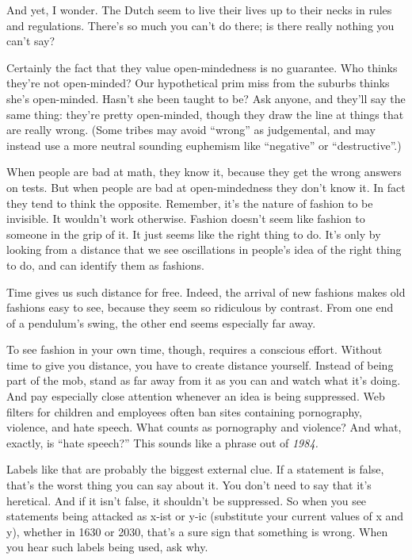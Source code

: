 And yet, I wonder. The Dutch seem to live their lives up to their necks
in rules and regulations. There's so much you can't do there; is there
really nothing you can't say?

Certainly the fact that they value open-mindedness is no guarantee. Who
thinks they're not open-minded? Our hypothetical prim miss from the
suburbs thinks she's open-minded. Hasn't she been taught to be? Ask
anyone, and they'll say the same thing: they're pretty open-minded,
though they draw the line at things that are really wrong. (Some tribes
may avoid ``wrong'' as judgemental, and may instead use a more neutral
sounding euphemism like ``negative'' or ``destructive''.)

When people are bad at math, they know it, because they get the wrong
answers on tests. But when people are bad at open-mindedness they don't
know it. In fact they tend to think the opposite. Remember, it's the
nature of fashion to be invisible. It wouldn't work otherwise. Fashion
doesn't seem like fashion to someone in the grip of it. It just seems
like the right thing to do. It's only by looking from a distance that we
see oscillations in people's idea of the right thing to do, and can
identify them as fashions.

Time gives us such distance for free. Indeed, the arrival of new
fashions makes old fashions easy to see, because they seem so ridiculous
by contrast. From one end of a pendulum's swing, the other end seems
especially far away.

To see fashion in your own time, though, requires a conscious effort.
Without time to give you distance, you have to create distance yourself.
Instead of being part of the mob, stand as far away from it as you can
and watch what it's doing. And pay especially close attention whenever
an idea is being suppressed. Web filters for children and employees
often ban sites containing pornography, violence, and hate speech. What
counts as pornography and violence? And what, exactly, is ``hate
speech?'' This sounds like a phrase out of \emph{1984.}

Labels like that are probably the biggest external clue. If a statement
is false, that's the worst thing you can say about it. You don't need to
say that it's heretical. And if it isn't false, it shouldn't be
suppressed. So when you see statements being attacked as x-ist or y-ic
(substitute your current values of x and y), whether in 1630 or 2030,
that's a sure sign that something is wrong. When you hear such labels
being used, ask why.

